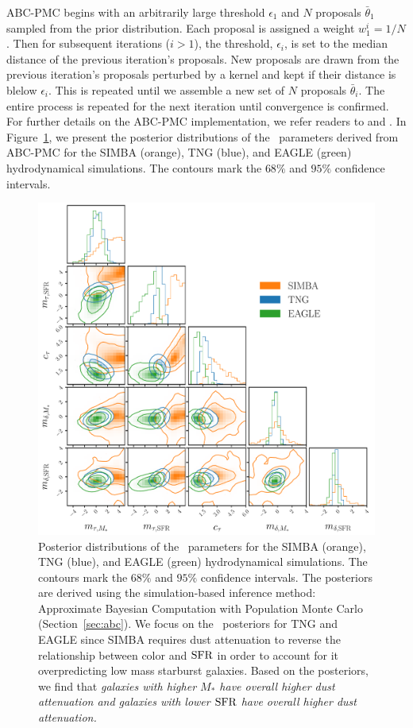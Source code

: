 ABC-PMC begins with an arbitrarily large threshold $\epsilon_1$ and $N$ proposals 
$\bar{\theta}_1$ sampled from the prior distribution. Each proposal is
assigned a weight $w^i_1 = 1/N$. Then for subsequent iterations ($i > 1$), the 
threshold, $\epsilon_i$, is set to the median distance of the previous iteration's
proposals. New proposals are drawn from the previous iteration's proposals perturbed 
by a kernel and kept if their distance is blelow $\epsilon_i$. This is repeated
until we assemble a new set of $N$ proposals $\bar{\theta}_i$. The entire
process is repeated for the next iteration until convergence is confirmed. For 
further details on the ABC-PMC implementation, we refer readers to \cite{hahn2017b}
and \cite{hahn2019a}.
In Figure~\ref{fig:abc}, we present the posterior distributions of the \eda~parameters
derived from ABC-PMC for the SIMBA (orange), TNG (blue), and EAGLE (green) hydrodynamical 
simulations. The contours mark the $68\%$ and $95\%$ confidence intervals. 

\begin{figure}
\begin{center}
    \includegraphics[width=\textwidth]{figs/abc.pdf}
    \caption{\label{fig:abc}
    Posterior distributions of the \eda~parameters for the SIMBA (orange), TNG
    (blue), and EAGLE (green) hydrodynamical simulations. The contours mark the $68\%$
    and $95\%$ confidence intervals. The posteriors are derived using the
    simulation-based inference method: Approximate Bayesian Computation with Population Monte Carlo
    (Section~\ref{sec:abc}). We focus on the \eda~posteriors for TNG and EAGLE
    since SIMBA requires dust attenuation to reverse the relationship between
    color and ${\rm SFR}$ in order to account for it overpredicting low mass starburst 
    galaxies. Based on the posteriors, we find that \emph{galaxies with higher
    $M_*$ have overall higher dust attenuation and galaxies with lower ${\rm SFR}$
    have overall higher dust attenuation.}
    }
\end{center}
\end{figure}

